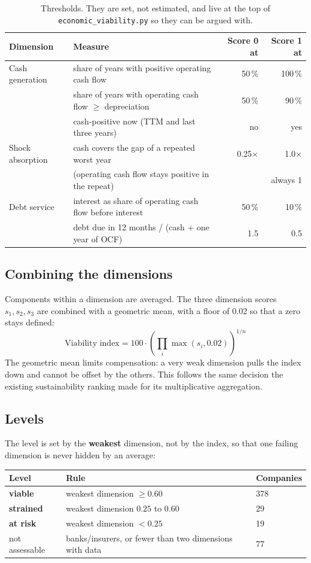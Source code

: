 \documentclass[11pt,a4paper]{article}
\newcommand{\code}[1]{\texttt{\small #1}}
\begin{document}
\begin{table}[h]
\centering\small
\begin{tabularx}{\linewidth}{@{}lLrr@{}}
\toprule
Dimension & Measure & Score 0 at & Score 1 at \\
\midrule
Cash generation & share of years with positive operating cash flow & 50\,\% & 100\,\% \\
 & share of years with operating cash flow $\ge$ depreciation & 50\,\% & 90\,\% \\
 & cash-positive now (TTM and last three years) & no & yes \\
Shock absorption & cash covers the gap of a repeated worst year & 0.25$\times$ & 1.0$\times$ \\
 & (operating cash flow stays positive in the repeat) & & always 1 \\
Debt service & interest as share of operating cash flow before interest & 50\,\% & 10\,\% \\
 & debt due in 12 months / (cash + one year of OCF) & 1.5 & 0.5 \\
\bottomrule
\end{tabularx}
\caption{Thresholds. They are set, not estimated, and live at the top of \code{economic\_viability.py} so they can be argued with.}
\end{table}

\subsection{Combining the dimensions}
Components within a dimension are averaged. The three dimension scores $s_1, s_2, s_3$ are combined with a geometric mean, with a floor of 0.02 so that a zero stays defined:
\[
\text{Viability index} = 100 \cdot \left(\prod_{i} \max(s_i, 0.02)\right)^{1/n}
\]
The geometric mean limits compensation: a very weak dimension pulls the index down and cannot be offset by the others. This follows the same decision the existing sustainability ranking made for its multiplicative aggregation.

\subsection{Levels}
The level is set by the \textbf{weakest} dimension, not by the index, so that one failing dimension is never hidden by an average:
\begin{center}
\begin{tabular}{@{}lll@{}}
\toprule
Level & Rule & Companies \\
\midrule
\textcolor{accent}{\textbf{viable}} & weakest dimension $\ge 0.60$ & 378 \\
\textcolor{warn}{\textbf{strained}} & weakest dimension $0.25$ to $0.60$ & 29 \\
\textcolor{risk}{\textbf{at risk}} & weakest dimension $< 0.25$ & 19 \\
not assessable & banks/insurers, or fewer than two dimensions with data & 77 \\
\bottomrule
\end{tabular}
\end{center}
\end{document}
